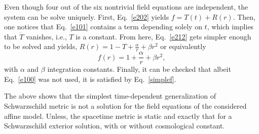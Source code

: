 Even though four out of the six nontrivial field equations are independent, the system can be solve uniquely. First, Eq.~\eqref{e202} yields $f = T(t) + R(r)$. Then, one notices that Eq.~\eqref{e101} contains a term depending solely on $t$, which implies that $\dot{T}$ vanishes, i.e., $T$ is a constant. From here, Eq.~\eqref{e212} gets simpler enough to be solved and yields, \mbox{$R(r) = 1 - T + \frac{\alpha}{r} + \beta r^2$} or equivalently
\begin{equation}
  f(r) = 1 + \frac{\alpha}{r} + \beta r^2,
  \label{simplef}
\end{equation}
with $\alpha$ and $\beta$ integration constants. Finally, it can be checked that albeit Eq.~\eqref{e100} was not used, it is satisfied by Eq.~\eqref{simplef}.

The above shows that the simplest time-dependent generalization of Schwarzschild metric is not a solution for the field equations of the considered affine model. Unless, the spacetime metric is static and exactly that for a Schwarzschild exterior solution, with or without cosmological constant.


